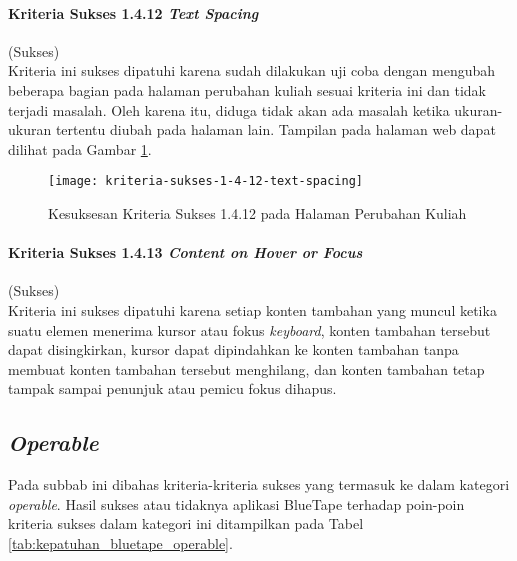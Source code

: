 \paragraph{Kriteria Sukses 1.4.12 \textit{Text Spacing}}
\label{par:kepatuhan_bluetape_kriteria_sukses_1.4.12}
(Sukses)\\

Kriteria ini sukses dipatuhi karena sudah dilakukan uji coba dengan mengubah beberapa bagian pada halaman perubahan kuliah sesuai kriteria ini dan tidak terjadi masalah. Oleh karena itu, diduga tidak akan ada masalah ketika ukuran-ukuran tertentu diubah pada halaman lain. Tampilan pada halaman web dapat dilihat pada Gambar \ref{fig:1.4.12_text_spacing}.

\begin{figure}[H]
    \centering  
    \texttt{[image: kriteria-sukses-1-4-12-text-spacing]}  
    \caption[Kesuksesan Kriteria Sukses 1.4.12 pada Halaman Perubahan Kuliah]{Kesuksesan Kriteria Sukses 1.4.12 pada Halaman Perubahan Kuliah}
    \label{fig:1.4.12_text_spacing}  
\end{figure} 

\paragraph{Kriteria Sukses 1.4.13 \textit{Content on Hover or Focus}}
\label{par:kepatuhan_bluetape_kriteria_sukses_1.4.13}
(Sukses)\\

Kriteria ini sukses dipatuhi karena setiap konten tambahan yang muncul ketika suatu elemen menerima kursor atau fokus \textit{keyboard}, konten tambahan tersebut dapat disingkirkan, kursor dapat dipindahkan ke konten tambahan tanpa membuat konten tambahan tersebut menghilang, dan konten tambahan tetap tampak sampai penunjuk atau pemicu fokus dihapus.

\subsection{\textit{Operable}}
\label{subsec:kepatuhan_bluetape_operable}
Pada subbab ini dibahas kriteria-kriteria sukses yang termasuk ke dalam kategori \textit{operable}. Hasil sukses atau tidaknya aplikasi BlueTape terhadap poin-poin kriteria sukses dalam kategori ini ditampilkan pada Tabel \ref{tab:kepatuhan_bluetape_operable}.

